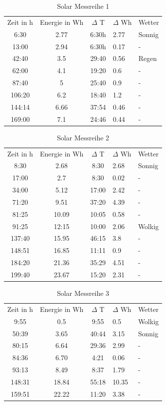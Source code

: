 \begin{table}[h!]
    \centering
    \begin{tabular}{cccll}
         Zeit in h&  Energie in Wh& $\Delta$ T&$\Delta$ Wh &Wetter\\
         6:30&  2.77&  6:30h&2.77 &Sonnig\\
         13:00&  2.94&  6:30h&0.17 &-\\
 42:40& 3.5& 29:40& 0.56&Regen\\
 62:00& 4.1& 19:20& 0.6&-\\
 87:40& 5& 25:40& 0.9&-\\
 106:20& 6.2& 18:40& 1.2&-\\
 144:14& 6.66& 37:54& 0.46&-\\
 169:00& 7.1& 24:46& 0.44&-\\
    \end{tabular}
    \caption{Solar Messreihe 1 }
    \label{tab:sol_mess1}
\end{table}
\begin{table}[h!]
    \centering
    \begin{tabular}{cccll}
         Zeit in h&  Energie in Wh& $\Delta$ T&$\Delta$ Wh &Wetter\\
         8:30&  2.68& 8:30&2.68 &Sonnig\\
         17:00&  2.7& 8:30&0.02 &-\\
         34:00&  5.12&  17:00&2.42 &-\\
         71:20&  9.51&  37:20&4.39 &-\\
         81:25&  10.09&  10:05& 0.58&-\\
 91:25& 12:15& 10:00& 2.06&Wolkig\\
 137:40& 15.95& 46:15& 3.8&-\\
 148:51& 16.85& 11:11& 0.9&-\\
 184:20& 21.36& 35:29& 4.51&-\\
 199:40& 23.67& 15:20& 2.31&-\\
    \end{tabular}
    \caption{Solar Messreihe 2}
    \label{tab:sol_mess2}
\end{table}
\begin{table}[h!]
    \centering
    \begin{tabular}{cccll}
         Zeit in h&  Energie in Wh&  $\Delta$ T& $\Delta$ Wh &Wetter\\
         9:55&  0.5&  9:55& 0.5&Wolkig\\
         50:39&  3.65&  40:44& 3.15&Sonnig\\
 80:15& 6.64& 29:36& 2.99&-\\
 84:36& 6.70& 4:21& 0.06&-\\
 93:13& 8.49& 8:37& 1.79&-\\
 148:31& 18.84& 55:18& 10.35&-\\
 159:51& 22.22& 11:20& 3.38&-\\
    \end{tabular}
    \caption{Solar Messreihe 3}
    \label{tab:sol_mess3}
\end{table}

